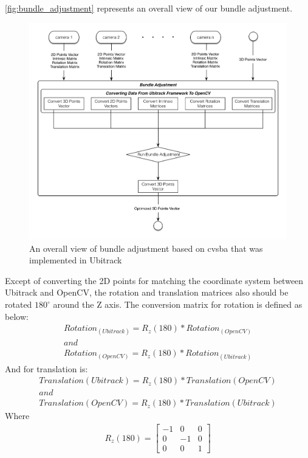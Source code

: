 \autoref{fig:bundle_adjustment} represents an overall view of our bundle adjustment.
 \begin{figure}[H]
  \centering
  \includegraphics[width=\textwidth]{figures/bundle_adjustment}
  \caption{An overall view of bundle adjustment based on cvsba that was implemented in Ubitrack}\label{fig:bundle_adjustment}
  \end{figure}

Except of converting the 2D points for matching the coordinate system between Ubitrack and OpenCV, the rotation and translation matrices also should be rotated $180 ^{\circ}$ around the Z axis. The conversion matrix for rotation is defined as below:
\begin{gather*}
	Rotation_{(Ubitrack)} = R_{z}(180) * Rotation_{(OpenCV)}\\
	and\\
    Rotation_{(OpenCV)} = R_{z}(180) * Rotation_{(Ubitrack)}
\end{gather*}
And for translation is:
\begin{gather*}
	Translation{(Ubitrack)} = R_{z}(180) * Translation{(OpenCV)}\\
	and\\
    Translation{(OpenCV)} = R_{z}(180) * Translation{(Ubitrack)}
\end{gather*}
Where 
\begin{gather*}
	R_{z}(180) = \begin{bmatrix}
       -1 & 0 & 0   \\[0.3em]
       0 & -1 & 0   \\[0.3em]
       0  & 0 & 1
     \end{bmatrix}
\end{gather*}

